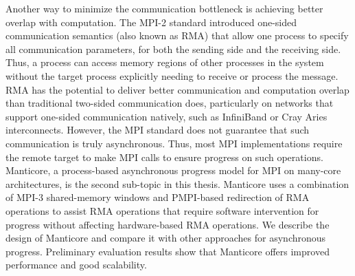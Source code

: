 Another way to minimize the communication bottleneck is achieving 
better overlap with computation. The MPI-2 standard introduced 
one-sided communication semantics (also known as RMA) 
that allow one process to specify all communication parameters, for 
both the sending side and the receiving side. Thus, a process can 
access memory regions of other processes in the system without the target 
process explicitly needing to receive or process the message.
RMA has the potential to deliver better communication and computation 
overlap than traditional two-sided communication does, particularly on networks 
that support one-sided communication natively, such as InfiniBand or 
Cray Aries interconnects. However, the MPI standard does not guarantee that 
such communication is truly asynchronous. Thus, most MPI implementations 
require the remote target to make MPI calls to ensure progress 
on such operations. Manticore, a process-based asynchronous progress
model for MPI on many-core architectures, is the second sub-topic 
in this thesis. Manticore uses a combination of MPI-3 shared-memory
windows and PMPI-based redirection of RMA operations to assist RMA
operations that require software intervention for progress without
affecting hardware-based RMA operations.  We describe the design of Manticore 
and compare it with other approaches for asynchronous progress.
Preliminary evaluation results show that Manticore offers improved 
performance and good scalability.

\clearpage

